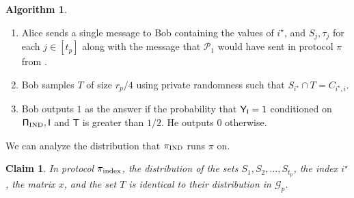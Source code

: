 \documentclass[11pt]{article}
\newtheorem{claim}[lemma]{Claim}
\theoremstyle{definition}
\newenvironment{ourbox}{\begin{mdframed}[hidealllines=false,innerleftmargin=10pt,backgroundcolor=white!10,innertopmargin=5pt,innerbottommargin=5pt,roundcorner=10pt]}{\end{mdframed}}
\newtheorem{mdalgorithm}{Algorithm}
\newenvironment{Algorithm}{\begin{ourbox}\begin{mdalgorithm}}{\end{mdalgorithm}\end{ourbox}}
\newcommand{\rv}[1]{\ensuremath{{\mathsf{#1}}}\xspace}
\newcommand{\rY}{\rv{Y}}
\newcommand{\player}[1]{\ensuremath{\mathcal{P}_{#1}}}
\newcommand{\cG}{\ensuremath{\mathcal{G}}}
\newcommand{\istar}{\ensuremath{i^{\star}}}
\newcommand{\prot}{\ensuremath{\pi}}
\newcommand{\rT}{\ensuremath{\rv{T}}}
\newcommand{\protindex}{\ensuremath{\prot_{\textnormal{\textsc{IND}}}}}
\begin{document}
\begin{Algorithm}
\begin{enumerate}[label=$(\roman*)$]
\begin{enumerate}
			\end{enumerate}
			 \item Alice sends a single message to Bob containing the values of $\istar$, and $S_j, \tau_j$ for each $j \in [t_p]$ along with the message that $\player{1}$ would have sent in protocol $\prot$ from . 
			\item Bob samples $T$ of size $r_p/4$ using private randomness such that $S_{\istar} \cap T = C_{\istar, i}$. 
			\item Bob outputs $1$ as the answer if the probability that $\rY_{\rI} = 1$ conditioned on $ \rProtIND, \rI$ and $\rT$ is greater than $ 1/2$. He outputs $0$ otherwise. 
		\end{enumerate}
	\end{Algorithm}
	
We can analyze the distribution that $\protindex$ runs $\prot$ on.
	\begin{claim}\label{clm:dist-same-index}
		In protocol $\prot_{\textnormal{index}}$, the distribution of the sets $S_1, S_2, \ldots, S_{t_p}$, the index $\istar$, the matrix $x$, and the set $T$ is identical to their distribution in $\cG_p$.
	\end{claim}
\end{document}

